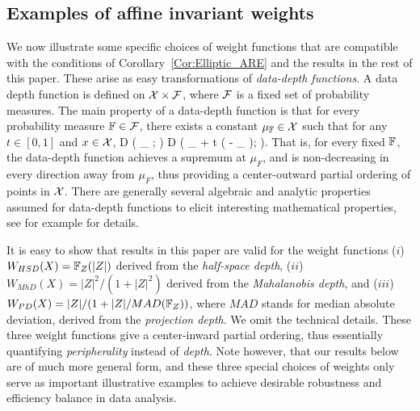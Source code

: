\subsection{Examples of affine invariant weights}

We now illustrate some specific choices of weight functions that are compatible with the 
conditions of Corollary~\ref{Cor:Elliptic_ARE} and the results in the rest of this paper.
 These arise as easy transformations 
of \textit{data-depth functions}. A data depth function 
is defined on $\mathcal{X} \times \mathcal{F}$, where $\mathcal{F}$ is  a fixed set of probability measures.
The main property of a data-depth function is that for every probability measure 
${\mathbb{F}} \in \mathcal{F}$, there exists a constant 
$\mu_{{\mathbb{F}}} \in  \mathcal{X}$ such that for any $t \in [ 0, 1]$ and $x \in \mathcal{X}$,
\baq 
D ( \mu_{\BF} ; \BF ) \geq D ( \mu_{\BF} + t ( \bfx - \mu_{\BF} ); \BF ). 
\label{eq:Peripherality}
\eaq
That is, for every fixed ${\mathbb{F}}$, the data-depth function achieves a supremum at 
$\mu_{F}$, and is non-decreasing in every direction away from $\mu_{F}$, thus providing 
a  center-outward partial ordering of points in $\mathcal{X}$. There are generally several 
algebraic and analytic properties assumed for data-depth functions to elicit interesting 
mathematical properties, see for example 
\cite{ref:AoS00461_ZuoSerfling, ref:DIMACS061_Serfling} 
for details.

It is easy to show that results in this paper are valid for the weight functions
($i$) $W_{HSD} (X) = {\mathbb{F}}_{Z} (| Z |)$ derived from the \textit{half-space depth},  
($ii$) $W_{MhD} (X) = |Z|^{2}/(1 + | Z |^2)$ derived from the \textit{Mahalanobis depth}, 
and  
($iii$) $W_{PD} (X) = |Z|/(1+ | Z |/MAD({\mathbb{F}}_{Z}))$, where $MAD$ stands for median 
absolute deviation, derived from the \textit{projection depth}. We omit the technical 
details. These three weight functions give a center-inward partial ordering, thus essentially 
quantifying \textit{peripherality} instead of \textit{depth}. Note however, that our results below are of much more general form, and these three special choices of weights only serve as important illustrative examples to achieve desirable robustness and efficiency balance in data analysis.


